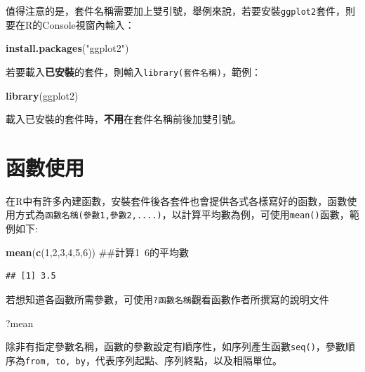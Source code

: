 \documentclass[]{book}
\newenvironment{Shaded}{\begin{snugshade}}{\end{snugshade}}
\newcommand{\KeywordTok}[1]{\textcolor[rgb]{0.13,0.29,0.53}{\textbf{{#1}}}}
\newcommand{\DecValTok}[1]{\textcolor[rgb]{0.00,0.00,0.81}{{#1}}}
\newcommand{\StringTok}[1]{\textcolor[rgb]{0.31,0.60,0.02}{{#1}}}
\newcommand{\NormalTok}[1]{{#1}}
\theoremstyle{definition}
\theoremstyle{definition}
\theoremstyle{remark}
\begin{document}
值得注意的是，套件名稱需要加上雙引號，舉例來說，若要安裝\texttt{ggplot2}套件，則要在R的Console視窗內輸入：

\begin{Shaded}
\begin{Highlighting}[]
\KeywordTok{install.packages}\NormalTok{(}\StringTok{"ggplot2"}\NormalTok{)}
\end{Highlighting}
\end{Shaded}

若要載入\textbf{已安裝}的套件，則輸入\texttt{library(套件名稱)}，範例：

\begin{Shaded}
\begin{Highlighting}[]
\KeywordTok{library}\NormalTok{(ggplot2)}
\end{Highlighting}
\end{Shaded}

載入已安裝的套件時，\textbf{不用}在套件名稱前後加雙引號。

\section{函數使用}

在R中有許多內建函數，安裝套件後各套件也會提供各式各樣寫好的函數，函數使用方式為\texttt{函數名稱(參數1,參數2,....)}，以計算平均數為例，可使用\texttt{mean()}函數，範例如下:

\begin{Shaded}
\begin{Highlighting}[]
\KeywordTok{mean}\NormalTok{(}\KeywordTok{c}\NormalTok{(}\DecValTok{1}\NormalTok{,}\DecValTok{2}\NormalTok{,}\DecValTok{3}\NormalTok{,}\DecValTok{4}\NormalTok{,}\DecValTok{5}\NormalTok{,}\DecValTok{6}\NormalTok{)) ##計算1~6的平均數}
\end{Highlighting}
\end{Shaded}

\begin{verbatim}
## [1] 3.5
\end{verbatim}

若想知道各函數所需參數，可使用\texttt{?函數名稱}觀看函數作者所撰寫的說明文件

\begin{Shaded}
\begin{Highlighting}[]
\NormalTok{?mean}
\end{Highlighting}
\end{Shaded}

除非有指定參數名稱，函數的參數設定有順序性，如序列產生函數\texttt{seq()}，參數順序為\texttt{from,\ to,\ by}，代表序列起點、序列終點，以及相隔單位。
\end{document}
